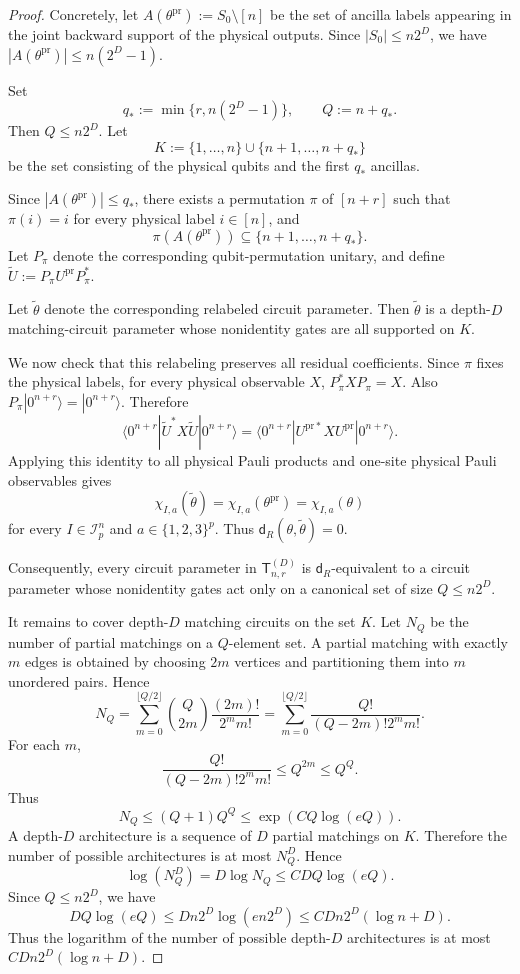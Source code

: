 \documentclass[12pt]{article}
\newcommand{\mcI}{\mathcal{I}}
\begin{document}
\begin{proof}
Concretely, let $A(\theta^{\mathrm{pr}}):=S_0\setminus[n]$ be the set of ancilla labels appearing in the joint backward support of the
physical outputs. Since \(|S_0|\le n2^D\), we have $|A(\theta^{\mathrm{pr}})|\le n(2^D-1)$.

Set
\[
    q_*:=\min\{r,n(2^D-1)\},
    \qquad
    Q:=n+q_*.
\]
Then \(Q\le n2^D\). Let
\[
    K:=\{1,\dots,n\}\cup\{n+1,\dots,n+q_*\}
\]
be the set consisting of the physical qubits and the first \(q_*\) ancillas.

Since \(|A(\theta^{\mathrm{pr}})|\le q_*\), there exists a permutation \(\pi\)
of \([n+r]\) such that \(\pi(i)=i\) for every physical label \(i\in[n]\), and
\[
    \pi(A(\theta^{\mathrm{pr}}))\subseteq\{n+1,\dots,n+q_*\}.
\]
Let \(P_\pi\) denote the corresponding qubit-permutation unitary, and define $\widetilde U:=P_\pi U^{\mathrm{pr}}P_\pi^*$.

Let \(\widetilde\theta\) denote the corresponding relabeled circuit parameter.
Then \(\widetilde\theta\) is a depth-\(D\) matching-circuit parameter whose
nonidentity gates are all supported on \(K\).

We now check that this relabeling preserves all residual coefficients. Since
\(\pi\) fixes the physical labels, for every physical observable \(X\), $P_\pi^*XP_\pi=X$. Also \(P_\pi|0^{n+r}\rangle=|0^{n+r}\rangle\). Therefore
\[
\langle0^{n+r}|\widetilde U^*X\widetilde U|0^{n+r}\rangle
=
\langle0^{n+r}|
U^{\mathrm{pr}*}XU^{\mathrm{pr}}
|0^{n+r}\rangle.
\]
Applying this identity to all physical Pauli products and one-site physical
Pauli observables gives
\[
    \chi_{I,a}(\widetilde\theta)
    =
    \chi_{I,a}(\theta^{\mathrm{pr}})
    =
    \chi_{I,a}(\theta)
\]
for every \(I\in\mcI_p^n\) and \(a\in\{1,2,3\}^p\). Thus $\mathsf d_R(\theta,\widetilde\theta)=0$.


Consequently, every circuit parameter in \(\mathsf{T}_{n,r}^{(D)}\) is
\(\mathsf{d}_{R}\)-equivalent to a circuit parameter whose nonidentity gates act only
on a canonical set of size $Q\le n2^D$. 


It remains to cover depth-\(D\) matching circuits on the set \(K\). Let \(N_Q\) be the number of partial matchings on a \(Q\)-element set. A partial matching with exactly \(m\) edges is
obtained by choosing \(2m\) vertices and partitioning them into \(m\) unordered
pairs. Hence
\[
    N_Q
    =
    \sum_{m=0}^{\lfloor Q/2\rfloor}
    \binom{Q}{2m} \frac{(2m)!}{2^m m!}
    =
    \sum_{m=0}^{\lfloor Q/2\rfloor}
    \frac{Q!}{(Q-2m)!2^m m!}.
\]
For each \(m\),
\[
    \frac{Q!}{(Q-2m)!2^m m!}
    \le Q^{2m}\le Q^Q.
\]
Thus
\[
    N_Q
    \le
    (Q+1)Q^Q
    \le
    \exp (CQ\log(eQ)).
\]
A depth-\(D\) architecture is a sequence of \(D\) partial matchings on \(K\). Therefore the number of possible architectures is at most \(N_Q^D\). Hence
\[
    \log(N_Q^D)
    =
    D\log N_Q
    \le
    C DQ\log(eQ).
\]
Since \(Q\le n2^D\), we have
\[
    DQ\log(eQ)
    \le
    Dn2^D\log(en2^D)
    \le
    C Dn2^D(\log n+D).
\]
Thus the logarithm of the number of possible depth-\(D\) architectures is at most $C Dn2^D(\log n+D)$.


\end{proof}
\end{document}

